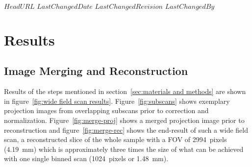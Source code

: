 \svnidlong
{$HeadURL$}
{$LastChangedDate$}
{$LastChangedRevision$}
{$LastChangedBy$}

\ifhtml
\else
\begin{center}
\end{center}
\fi

\section{Results}
\label{sec:Results}
\subsection{Image Merging and Reconstruction}
\label{sec:Image Merging and Reconstruction}
Results of the steps mentioned in section~\ref{sec:materials and methods} are shown in figure~\ref{fig:wide field scan results}. Figure~\ref{fig:subscans} shows exemplary projection images from overlapping subscans prior to correction and normalization. Figure~\ref{fig:merge-proj} shows a merged projection image prior to reconstruction and figure~\ref{fig:merge-rec} shows the end-result of such a wide field scan, a reconstructed slice of the whole sample with a FOV of \SI{2994}{pixels} (\SI{4.19}{\milli\meter}) which is approximately three times the size of what can be achieved with one single binned scan (\SI{1024}{pixels} or \SI{1.48}{\milli\meter}).

